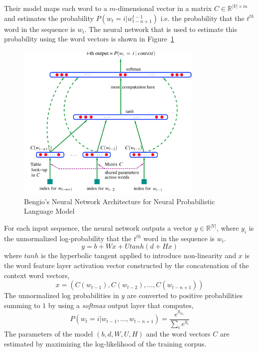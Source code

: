 Their model maps each word to a $m$-dimensional vector in a matrix $C \in \mathbb{R}^{|V|\times m}$ and estimates the probability $P(w_{t} = i|w_{t-n+1}^{t-1})$ i.e. the probability that the $t^{th}$ word in the sequence is $w_{i}$. The neural network that is used to estimate this probability using the word vectors is shown in Figure~\ref{fig:nn:bengio}
\begin{figure}[t!]
    \centering
        \includegraphics[width=0.8\textwidth]{figs/bengio_nn.png}
    \caption{Bengio's Neural Network Architecture for Neural Probabilistic Language Model}
    \label{fig:nn:bengio}
\end{figure}
For each input sequence, the neural network outputs a vector $y \in \mathbb{R}^{|V|}$, where $y_{i}$ is the unnormalized log-probability that the $t^{th}$ word in the sequence is $w_{i}$.
\begin{equation}
y = b + Wx + Utanh(d + Hx)
\end{equation}
where $tanh$ is the hyperbolic tangent applied to introduce non-linearity and $x$ is the word feature layer activation vector constructed by the concatenation of the context word vectors,
\begin{equation}
x = (C(w_{t-1}), C(w_{t-2}), \ldots, C(w_{t-n+1}))
\end{equation}
The unnormalized log probabilities in $y$ are converted to positive probabilities summing to $1$ by using a \emph{softmax} output layer that computes, 
\begin{equation}
P(w_{t} = i | w_{t-1}, \ldots, w_{t-n+1}) = \frac{e^{y_{w_t}}}{\sum_{i}e^{y_{i}}}
\end{equation}
The parameters of the model $(b, d, W, U, H)$ and the word vectors $C$ are estimated by maximizing the log-likelihood of the training corpus.

